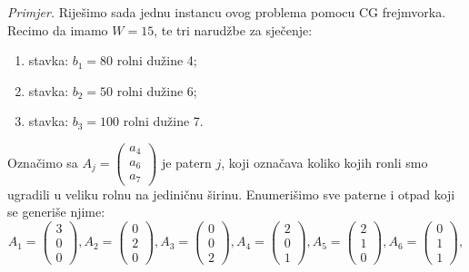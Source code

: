 \documentclass[a4paper, utf8, 11pt, colorlinks]{book}
\begin{document}
 \emph{Primjer.} Riješimo sada jednu instancu ovog problema pomocu CG frejmvorka. Recimo da imamo $W = 15$, te tri narudžbe za sječenje:
 \begin{enumerate}
 	\item stavka: $b_1=80$ rolni dužine 4;
 	\item stavka: $b_2=50$ rolni dužine 6;
 	\item stavka: $b_3=100$ rolni dužine 7. 
 \end{enumerate}
 Označimo sa $A_j = \begin{pmatrix}
                          a_4 \\
                          a_6 \\
                          a_7
                   \end{pmatrix}$
               je patern $j$, koji označava koliko   kojih ronli smo ugradili u veliku rolnu na jediničnu širinu. Enumerišimo sve paterne i otpad koji se generiše njime: 
               $$A_1 = 
               \begin{pmatrix}
               	     3 \\
               	     0 \\
               	     0  
               \end{pmatrix},
               A_2=\begin{pmatrix}
                 	0 \\
                	2 \\
                	0  
               \end{pmatrix}, 
           A_3=\begin{pmatrix}
           	0 \\
           	0 \\
           	2  
         \end{pmatrix},
           A_4=  \begin{pmatrix}
           	2 \\
           	0 \\
           	1  
           \end{pmatrix},
       A_5 = \begin{pmatrix}
       	2 \\
       	1 \\
       	0  
       \end{pmatrix},
   A_6 =\begin{pmatrix}
      	0 \\
        1 \\
      	1  
   \end{pmatrix},$$
\end{document}
